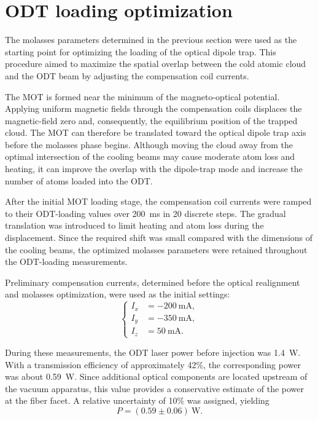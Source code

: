 \section{ODT loading optimization}
\label{sec:odt_loading_optimization}

The molasses parameters determined in the previous section were used as the starting point for optimizing the loading of the optical dipole trap. This procedure aimed to maximize the spatial overlap between the cold atomic cloud and the ODT beam by adjusting the compensation coil currents.

The MOT is formed near the minimum of the magneto-optical potential. Applying uniform magnetic fields through the compensation coils displaces the magnetic-field zero and, consequently, the equilibrium position of the trapped cloud. The MOT can therefore be translated toward the optical dipole trap axis before the molasses phase begins. Although moving the cloud away from the optimal intersection of the cooling beams may cause moderate atom loss and heating, it can improve the overlap with the dipole-trap mode and increase the number of atoms loaded into the ODT.

After the initial MOT loading stage, the compensation coil currents were ramped to their ODT-loading values over 200~ms in 20 discrete steps. The gradual translation was introduced to limit heating and atom loss during the displacement. Since the required shift was small compared with the dimensions of the cooling beams, the optimized molasses parameters were retained throughout the ODT-loading measurements.

Preliminary compensation currents, determined before the optical realignment and molasses optimization, were used as the initial settings:
\begin{equation}
    \begin{cases}
        I_x &= -200~\mathrm{mA}, \\
        I_y &= -350~\mathrm{mA}, \\
        I_z &= 50~\mathrm{mA}.
    \end{cases}
    \label{eq:shim_shifted_MOT_preliminary}
\end{equation}

During these measurements, the ODT laser power before injection was 1.4~W. With a transmission efficiency of approximately 42\%, the corresponding power was about 0.59~W. Since additional optical components are located upstream of the vacuum apparatus, this value provides a conservative estimate of the power at the fiber facet. A relative uncertainty of 10\% was assigned, yielding
\begin{equation}
    P=(0.59\pm0.06)~\mathrm{W}.
\end{equation}


